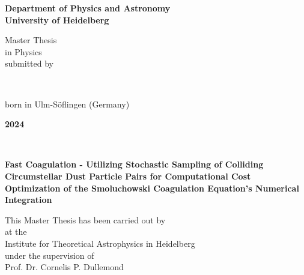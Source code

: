 \begin{titlepage}
    \begin{center}
        \begin{Large}
            \textbf{
              Department of Physics and Astronomy \\
              University of Heidelberg
            }
        \end{Large}

        \vfill
        
        Master Thesis \\
        in Physics \\
        submitted by \\
        \vspace{0.5cm}

        \begin{Large}
            \textbf{\theauthor} \\
        \end{Large}
        \vspace{0.5cm}

        born in Ulm-Söflingen (Germany) \\
        \vspace{0.5cm}

        \begin{Large}
            \textbf{2024}
        \end{Large}
    \end{center}
\end{titlepage}

\begin{titlepage}
    \ 
\end{titlepage}

\begin{titlepage}
    \begin{center}
        \begin{Large}
            \textbf{
                Fast Coagulation - Utilizing Stochastic Sampling of Colliding Circumstellar Dust 
                Particle Pairs for Computational Cost Optimization of the Smoluchowski Coagulation 
                Equation's Numerical Integration
            }
        \end{Large}
        
        \vfill
        
        This Master Thesis has been carried out by \theauthor \\
        at the \\
        Institute for Theoretical Astrophysics in Heidelberg \\
        under the supervision of \\
        Prof. Dr. Cornelis P. Dullemond
    \end{center}
\end{titlepage}

